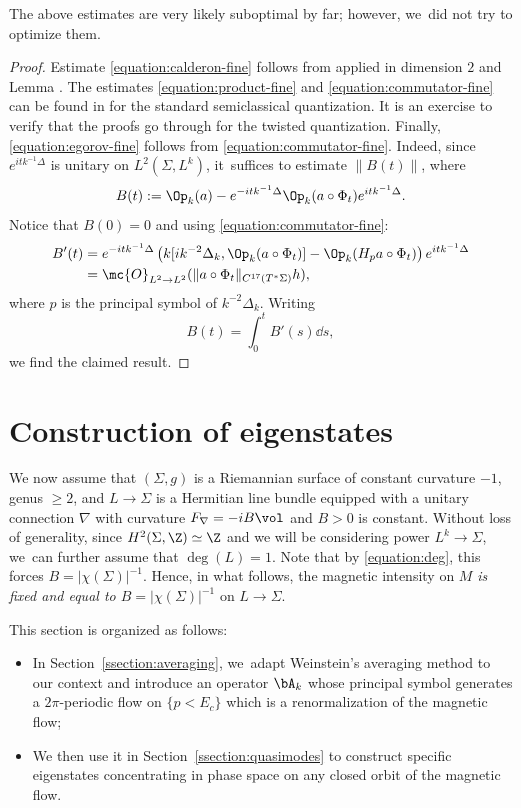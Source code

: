 The above estimates are very likely suboptimal by far; however, we~did not try to optimize them.

\begin{proof}
Estimate \eqref{equation:calderon-fine} follows from \cite[Th.\,5.26]{Nonnenmacher-notes} applied in dimension $2$ and Lemma \cite[Lem.\,A.4]{Dyatlov-Jin-Nonnenmacher-22}. The estimates \eqref{equation:product-fine} and \eqref{equation:commutator-fine} can be found in \cite[Lem.\,A.6]{Dyatlov-Jin-Nonnenmacher-22} for the standard semiclassical quantization. It is an exercise to verify that the proofs go through for the twisted quantization. Finally, \eqref{equation:egorov-fine} follows from \eqref{equation:commutator-fine}. Indeed, since $e^{it k^{-1} \Delta}$ is unitary on $L^2(\Sigma, L^k)$, it~suffices to estimate $\|B(t)\|$, where
\[
B(t) := \Op_k(a) - e^{-itk^{-1}\Delta}\Op_k(a\circ\Phi_t)e^{itk^{-1}\Delta}.
\]
Notice that $B(0)=0$ and using \eqref{equation:commutator-fine}:
\[
\begin{split}
B'(t) &= e^{-itk^{-1}\Delta}\left(k[ik^{-2}\Delta_k,\Op_k(a\circ\Phi_t)]-\Op_k(H_p a \circ\Phi_t) \right) e^{itk^{-1}\Delta} \\
& = \mc{O}_{L^2 \to L^2}(\|a\circ\Phi_t\|_{C^{17}(T^*\Sigma)} h),
\end{split}
\]
where $p$ is the principal symbol of $k^{-2}\Delta_k$. Writing
\[
B(t) = \int_0^t B'(s)\dd s,
\]
we find the claimed result.
\end{proof}

\section{Construction of eigenstates}

\label{section:constant}

We now assume that $(\Sigma,g)$ is a Riemannian surface of constant curvature $-1$, genus $\geq 2$, and $L \to \Sigma$ is a Hermitian line bundle equipped with a unitary connection $\nabla$ with curvature $F_\nabla = -iB\vol$ and $B > 0$ is constant. Without loss of generality, since $H^2(\Sigma,\Z) \simeq \Z$ and we will be
considering power $L^k \to \Sigma$, we~can further assume that $\deg(L)=1$.
Note that by \eqref{equation:deg}, this forces $B = |\chi(\Sigma)|^{-1}$. Hence, in what follows, the magnetic intensity on $M$ \emph{is fixed and equal to $B = |\chi(\Sigma)|^{-1}$} on $L \to \Sigma$.

This section is organized as follows:
\begin{itemize}

\item In Section~\ref{ssection:averaging}, we~adapt Weinstein's averaging method \cite{Weinstein-77} to our context and introduce an operator $\bA_k$ whose principal symbol generates a $2\pi$-periodic flow on $\{p < E_c\}$ which is a renormalization of the magnetic flow;

\item We then use it in Section~\ref{ssection:quasimodes} to construct specific eigenstates concentrating in phase space on any closed orbit of the magnetic flow.
\end{itemize}

